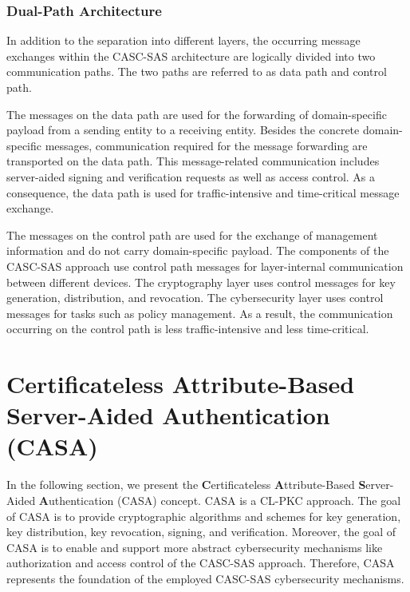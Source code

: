 \subsubsection{Dual-Path Architecture}
\label{sec:approach:casc:architecture:paths}
In addition to the separation into different layers, the occurring message exchanges within the CASC-SAS architecture are logically divided into two communication paths.
The two paths are referred to as data path and control path.

The messages on the data path are used for the forwarding of domain-specific payload from a sending entity to a receiving entity.
Besides the concrete domain-specific messages, communication required for the message forwarding are transported on the data path.
This message-related communication includes server-aided signing and verification requests as well as access control.
As a consequence, the data path is used for traffic-intensive and time-critical message exchange.

The messages on the control path are used for the exchange of management information and do not carry domain-specific payload.
The components of the CASC-SAS approach use control path messages for layer-internal communication between different devices.
The cryptography layer uses control messages for key generation, distribution, and revocation.
The cybersecurity layer uses control messages for tasks such as policy management.
As a result, the communication occurring on the control path is less traffic-intensive and less time-critical.



\section{Certificateless Attribute-Based Server-Aided Authentication (CASA)}
\label{sec:approach:casa}
In the following section, we present the \textbf{C}ertificateless \textbf{A}ttribute-Based \textbf{S}erver-Aided \textbf{A}uthentication (CASA) concept.
CASA is a CL-PKC approach.
The goal of CASA is to provide cryptographic algorithms and schemes for key generation, key distribution, key revocation, signing, and verification.
Moreover, the goal of CASA is to enable and support more abstract cybersecurity mechanisms like authorization and access control of the CASC-SAS approach.
Therefore, CASA represents the foundation of the employed CASC-SAS cybersecurity mechanisms.

